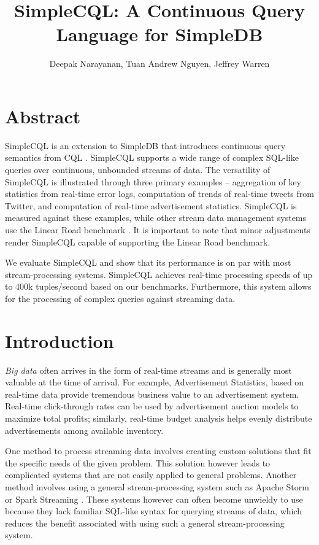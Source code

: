 \documentclass[a4paper, 10pt, conference]{IEEEconf}
\title{\LARGE \bf SimpleCQL: A Continuous Query Language for SimpleDB}
\author{Deepak Narayanan, Tuan Andrew Nguyen, Jeffrey Warren}
\begin{document}
\maketitle
\thispagestyle{empty}
\pagestyle{empty}


\section*{Abstract}

SimpleCQL is an extension to SimpleDB \cite{simpledb} that introduces continuous query semantics from CQL \cite{cql}. SimpleCQL supports a wide range of complex SQL-like queries over continuous, unbounded streams of data.  The versatility of SimpleCQL is illustrated through three primary examples -- aggregation of key statistics from real-time error logs, computation of trends of real-time tweets from Twitter, and computation of real-time advertisement statistics.  SimpleCQL is measured against these examples, while other stream data management systems use the Linear Road benchmark \cite{linear}.  It is important to note that minor adjustments render SimpleCQL capable of supporting the Linear Road benchmark.

We evaluate SimpleCQL and show that its performance is on par with most stream-processing systems.  SimpleCQL achieves real-time processing speeds of up to 400k tuples/second based on our benchmarks.  Furthermore, this system allows for the processing of complex queries against streaming data.

\section{Introduction}

\textit{Big data} often arrives in the form of real-time streams and is generally most valuable at the time of arrival. For example, Advertisement Statistics, based on real-time data provide tremendous business value to an advertisement system.  Real-time click-through rates can be used by advertisement auction models to maximize total profits; similarly, real-time budget analysis helps evenly distribute advertisements among available inventory.

One method to process streaming data involves creating custom solutions that fit the specific needs of the given problem.  This solution however leads to complicated systems that are not easily applied to general problems.  Another method involves using a general stream-processing system such as Apache Storm \cite{storm} or Spark Streaming \cite{spark_streaming}.  These systems however can often become unwieldy to use because they lack familiar SQL-like syntax for querying streams of data, which reduces the benefit associated with using such a general stream-processing system.
\end{document}
